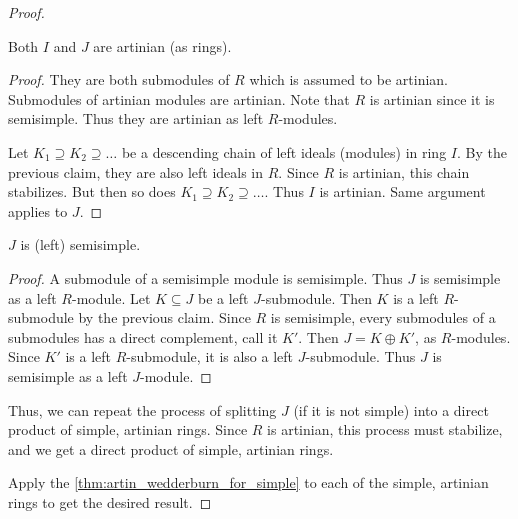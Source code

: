 \begin{proof}
  \begin{claim}
    Both $I$ and $J$ are artinian (as rings).
  \end{claim}
  \begin{proof}
    \leanok
    They are both submodules of $R$ which is assumed to be artinian. Submodules of artinian modules are artinian. Note that $R$ is artinian since it is semisimple. Thus they are artinian as left $R$-modules.

    Let $K_1 \supseteq K_2 \supseteq \ldots$ be a descending chain of left ideals (modules) in ring $I$. By the previous claim, they are also left ideals in $R$. Since $R$ is artinian, this chain stabilizes. But then so does $K_1 \supseteq K_2 \supseteq \ldots$. Thus $I$ is artinian. Same argument applies to $J$.
  \end{proof}

  \begin{claim}
    $J$ is (left) semisimple.
  \end{claim}
  \begin{proof}
    \leanok
    A submodule of a semisimple module is semisimple. Thus $J$ is semisimple as a left $R$-module. Let $K \subseteq J$ be a left $J$-submodule. Then $K$ is a left $R$-submodule by the previous claim. Since $R$ is semisimple, every submodules of a submodules has a direct complement, call it $K'$. Then $J = K \oplus K'$, as $R$-modules. Since $K'$ is a left $R$-submodule, it is also a left $J$-submodule. Thus $J$ is semisimple as a left $J$-module.
  \end{proof}

  Thus, we can repeat the process of splitting $J$ (if it is not simple) into a direct product of simple, artinian rings. Since $R$ is artinian, this process must stabilize, and we get a direct product of simple, artinian rings.

  Apply the \ref{thm:artin_wedderburn_for_simple} to each of the simple, artinian rings to get the desired result.
\end{proof}